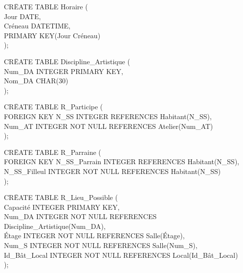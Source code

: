 \documentclass[a4paper,10.5pt]{report}
\begin{document}
		\begin{tabbing}
			CR\=EATE TABLE Horaire (\\
			\> Jour DATE,\\
			\> Créneau DATETIME,\\
			\> PRIMARY KEY(Jour Créneau)\\);
		\end{tabbing}
		\begin{tabbing}
			CR\=EATE TABLE Discipline\_Artistique (\\
			\> Num\_DA INTEGER PRIMARY KEY,\\
			\> Nom\_DA CHAR(30)\\);
		\end{tabbing}
		\begin{tabbing}
			CR\=EATE TABLE R\_Participe (\\
			\> FOREIGN KEY N\_SS INTEGER REFERENCES Habitant(N\_SS),\\
			\> Num\_AT INTEGER NOT NULL REFERENCES Atelier(Num\_AT)\\);
		\end{tabbing}
		\begin{tabbing}
			CR\=EATE TABLE R\_Parraine (\\
			\> FOREIGN KEY N\_SS\_Parrain INTEGER REFERENCES Habitant(N\_SS),\\
			\> N\_SS\_Filleul INTEGER NOT NULL REFERENCES Habitant(N\_SS)\\);
		\end{tabbing}
		\begin{tabbing}
			CR\=EATE TABLE R\_Lieu\_Possible (\\
			\> Capacité INTEGER PRIMARY KEY,\\
			\> Num\_DA INTEGER NOT NULL REFERENCES Discipline\_Artistique(Num\_DA),\\
			\> Étage INTEGER NOT NULL REFERENCES Salle(Étage),\\
			\> Num\_S INTEGER NOT NULL REFERENCES Salle(Num\_S),\\
			\> Id\_Bât\_Local INTEGER NOT NULL REFERENCES Local(Id\_Bât\_Local)\\);
		\end{tabbing}
\end{document}
